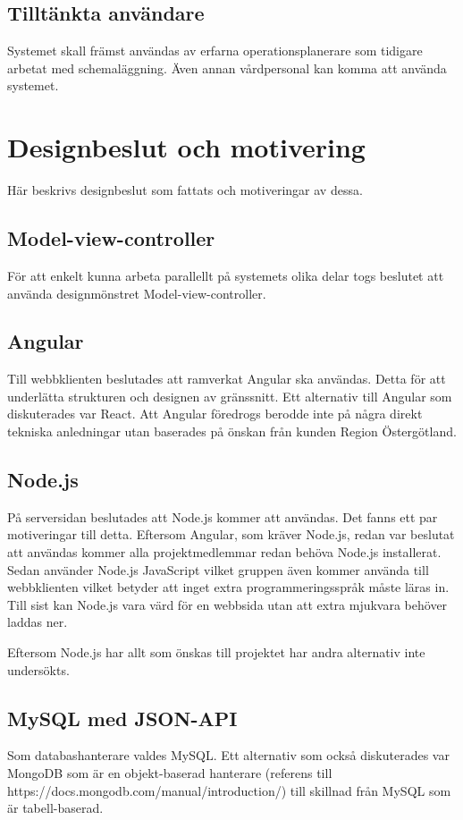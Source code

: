 \documentclass[a4paper,10pt]{article}
\begin{document}
\subsection{Tilltänkta användare}
Systemet skall främst användas av erfarna operationsplanerare som tidigare arbetat med schemaläggning. Även annan vårdpersonal kan komma att använda systemet.

\section{Designbeslut och motivering}
Här beskrivs designbeslut som fattats och motiveringar av dessa.

\subsection{Model-view-controller}
För att enkelt kunna arbeta parallellt på systemets olika delar togs beslutet att använda designmönstret Model-view-controller.

\subsection{Angular}
Till webbklienten beslutades att ramverkat Angular ska användas. Detta för att underlätta strukturen och designen av gränssnitt.
Ett alternativ till Angular som diskuterades var React. Att Angular föredrogs berodde inte på några direkt tekniska anledningar utan baserades på önskan från kunden Region Östergötland.

\subsection{Node.js}
På serversidan beslutades att Node.js kommer att användas. Det fanns ett par motiveringar till detta. Eftersom Angular, som kräver Node.js, redan var beslutat att användas kommer alla projektmedlemmar redan behöva Node.js installerat. Sedan använder Node.js JavaScript vilket gruppen även kommer använda till webbklienten vilket betyder att inget extra programmeringsspråk måste läras in. Till sist kan Node.js vara värd för en webbsida utan att extra mjukvara behöver laddas ner.

Eftersom Node.js har allt som önskas till projektet har andra alternativ inte undersökts.

\subsection{MySQL med JSON-API}
Som databashanterare valdes MySQL. Ett alternativ som också diskuterades var MongoDB som är en objekt-baserad hanterare (referens till https://docs.mongodb.com/manual/introduction/) till skillnad från MySQL som är tabell-baserad.
\end{document}
